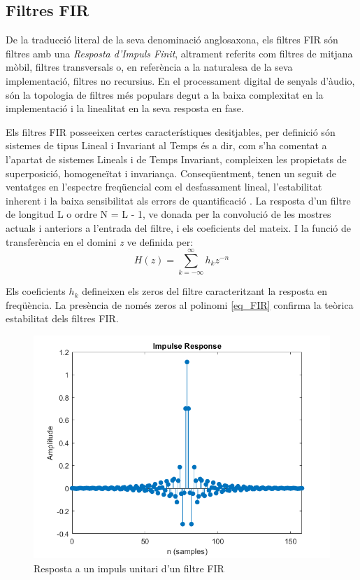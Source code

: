 \subsection{Filtres FIR}
\par De la traducció literal de la seva denominació anglosaxona, els filtres FIR són filtres amb una \textit{Resposta d'Impuls Finit}, altrament referits com filtres de mitjana mòbil, filtres transversals o, en referència a la naturalesa de la seva implementació, filtres no recursius. En el processament digital de senyals d'àudio, són la topologia de filtres més populars degut a la baixa complexitat en la implementació i la linealitat en la seva resposta en fase.
\par Els filtres FIR posseeixen certes característiques desitjables, per definició són sistemes de tipus Lineal i Invariant al Temps és a dir, com s'ha comentat a l'apartat de sistemes Lineals i de Temps Invariant, compleixen les propietats de superposició, homogeneïtat i invariança. Conseqüentment, tenen un seguit de ventatges en l'espectre freqüencial com el desfassament lineal, l'estabilitat inherent i la baixa sensibilitat als errors de quantificació \cite{DigitalSignalPr}. La resposta d'un filtre de longitud L o ordre N = L - 1, ve donada per la convolució de les mostres actuals i anteriors a l'entrada del filtre, i els coeficients del mateix. I la funció de transferència en el domini \textit{z} ve definida per:
\begin{equation}\label{eq_FIR}
    H(z) = \sum_{k=-\infty}^{\infty} h_k z^{-n}
\end{equation}
\par Els coeficients $h_k$ defineixen els zeros del filtre caracteritzant la resposta en freqüència. La presència de només zeros al polinomi \ref{eq_FIR} confirma la teòrica estabilitat dels filtres FIR.
\begin{figure}[H]
    \centering
    \includegraphics[width=0.5\linewidth]{Images/FIRimpulse.png}
    \caption{Resposta a un impuls unitari d'un filtre FIR}
    \label{figFIRimpulse}
\end{figure}

